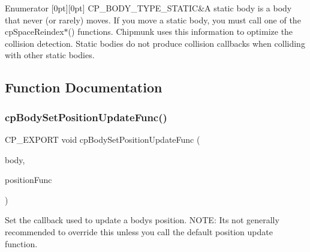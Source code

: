 \begin{DoxyEnumFields}{Enumerator}
[0pt][0pt]{}\mbox{\label{group__cp_body_gga3581b128fd3e2734952aeac8545fd5caaa594879f082bbabce4bd16944f73456b}} 
C\+P\+\_\+\+B\+O\+D\+Y\+\_\+\+T\+Y\+P\+E\+\_\+\+S\+T\+A\+T\+IC&A static body is a body that never (or rarely) moves. If you move a static body, you must call one of the cp\+Space\+Reindex$\ast$() functions. Chipmunk uses this information to optimize the collision detection. Static bodies do not produce collision callbacks when colliding with other static bodies. \\
\hline

\end{DoxyEnumFields}


\subsection{Function Documentation}
\mbox{\label{group__cp_body_gaa3c5a0ad4bfa91f4e24fb558c743fdba}} 
\subsubsection{\texorpdfstring{cp\+Body\+Set\+Position\+Update\+Func()}{cpBodySetPositionUpdateFunc()}}
{\footnotesize\ttfamily C\+P\+\_\+\+E\+X\+P\+O\+RT void cp\+Body\+Set\+Position\+Update\+Func (\begin{DoxyParamCaption}\item[{\mbox{\hyperlink{structcp_body}{cp\+Body}} $\ast$}]{body,  }\item[{\mbox{\hyperlink{group__cp_body_ga3386e3b0b4156289ab6099cc64c952e7}{cp\+Body\+Position\+Func}}}]{position\+Func }\end{DoxyParamCaption})}

Set the callback used to update a body\textquotesingle{}s position. N\+O\+TE\+: It\textquotesingle{}s not generally recommended to override this unless you call the default position update function. 